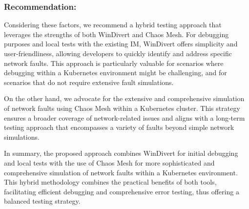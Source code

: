 \subsubsection{Recommendation:}
Considering these factors, we recommend a hybrid testing approach that leverages the strengths of both WinDivert and Chaos Mesh. For debugging purposes and local tests with the existing \ac{IM}, WinDivert offers simplicity and user-friendliness, allowing developers to quickly identify and address specific network faults. This approach is particularly valuable for scenarios where debugging within a Kubernetes environment might be challenging, and for scenarios that do not require extensive fault simulations.

On the other hand, we advocate for the extensive and comprehensive simulation of network faults using Chaos Mesh within a Kubernetes cluster. This strategy ensures a broader coverage of network-related issues and aligns with a long-term testing approach that encompasses a variety of faults beyond simple network simulations.

In summary, the proposed approach combines WinDivert for initial debugging and local tests with the use of Chaos Mesh for more sophisticated and comprehensive simulation of network faults within a Kubernetes environment. This hybrid methodology combines the practical benefits of both tools, facilitating efficient debugging and comprehensive error testing, thus offering a balanced testing strategy.